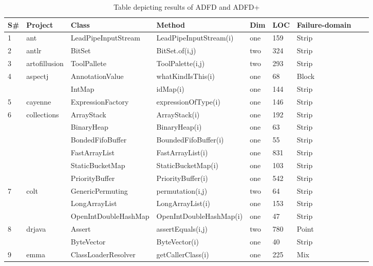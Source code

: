 \documentclass[runningheads,a4paper]{llncs}
\begin{document}
\begin{table}[h]
\caption{Table depicting results of ADFD and ADFD+}
\centering
{\renewcommand{\arraystretch}{.7}
\begin{tabular}{|l|l|l|l|l|l|l|l|l|}
\hline

S\# 	& 	Project 		& Class					& Method 				& Dim   		& LOC 	& Failure-domain 							\\
\hline
1	&	ant			& LeadPipeInputStream	& LeadPipeInputStream(i) 	& one		& 159	& Strip     									\\ 
2	&	antlr		& BitSet					& BitSet.of(i,j)			& two		& 324	& Strip 	 									\\
3	&	artofillusion	& ToolPallete			  	& ToolPalette(i,j)			& two		& 293	& Strip										\\ 
4	&	aspectj		& AnnotationValue	  	& whatKindIsThis(i)		& one		& 68	& Block										\\ 
	&				& IntMap			  	& idMap(i)				& one		& 144	& Strip										\\ 
5	&	cayenne		& ExpressionFactory	  	& expressionOfType(i)	& one		& 146	& Strip										\\ 
6	&	collections	& ArrayStack				& ArrayStack(i)			& one		& 192	& Strip  										\\ 
	&				& BinaryHeap			& BinaryHeap(i)			& one		& 63	& Strip  										\\
	&				& BondedFifoBuffer		& BoundedFifoBuffer(i)	& one		& 55	& Strip  										\\
	&				& FastArrayList			& FastArrayList(i)			& one		& 831	& Strip  										\\ 
	&				& StaticBucketMap		& StaticBucketMap(i)		& one		& 103	& Strip  										\\ 
	&				& PriorityBuffer			& PriorityBuffer(i)			& one		& 542	& Strip  										\\ 
7	&	colt			& GenericPermuting		& permutation(i,j)		& two		& 64	& Strip  										\\ 
	&				& LongArrayList			& LongArrayList(i)		& one		& 153	& Strip  										\\ 
	&				& OpenIntDoubleHashMap& OpenIntDoubleHashMap(i) & one		& 47	& Strip  										\\ 
8	&	drjava		& Assert					& assertEquals(i,j)		& two		& 780	& Point										\\ 
	&				& ByteVector				& ByteVector(i)			& one		& 40	& Strip  										\\ 			
9	&	emma		& ClassLoaderResolver	& getCallerClass(i)		& one		& 225	& Mix										\\ 

\end{tabular}}
\end{table}
\end{document}
